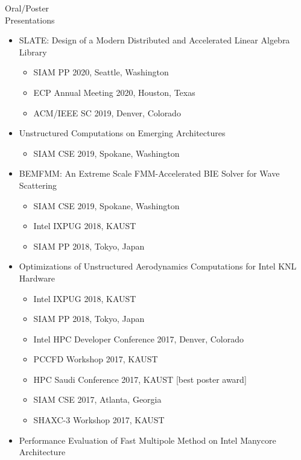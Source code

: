 \documentclass[10pt,a4paper]{article}
\begin{document}
\begin{cv}
\begin{cvlist}{}
\vspace{+2mm}
\item[{\parbox[t][0pt][t]{1in}{{\sc Oral/Poster}\\ {\sc Presentations}}}]
\begin{itemize}[label=\raisebox{0.25ex}{\tiny$\bullet$},nosep, leftmargin=*]
  \item
  SLATE: Design of a Modern Distributed and Accelerated Linear Algebra Library
  \begin{itemize}
  \item
  SIAM PP 2020, Seattle, Washington
  \item
  ECP Annual Meeting 2020, Houston, Texas
  \item
  ACM/IEEE SC 2019, Denver, Colorado
  \end{itemize}
  \item
  Unstructured Computations on Emerging Architectures
  \begin{itemize}
  \item
  SIAM CSE 2019, Spokane, Washington
  \end{itemize}
  \item
  BEMFMM: An Extreme Scale FMM-Accelerated BIE Solver for Wave Scattering
  \begin{itemize}
  \item
  SIAM CSE 2019, Spokane, Washington
  \item
  Intel IXPUG 2018, KAUST
  \item
  SIAM PP 2018, Tokyo, Japan
  \end{itemize}
  \item
  Optimizations of Unstructured Aerodynamics Computations for Intel KNL Hardware
  \begin{itemize}
  \item
  Intel IXPUG 2018, KAUST
  \item
  SIAM PP 2018, Tokyo, Japan
  \item
  Intel HPC Developer Conference 2017, Denver, Colorado
  \item
  PCCFD Workshop 2017, KAUST
  \item
  HPC Saudi Conference 2017, KAUST [best poster award]
  \item
  SIAM CSE 2017, Atlanta, Georgia
  \item
  SHAXC-3 Workshop 2017, KAUST
  \end{itemize}
  \item
  Performance Evaluation of Fast Multipole Method on Intel Manycore Architecture

\end{itemize}
\end{cvlist}
\end{cv}
\end{document}
